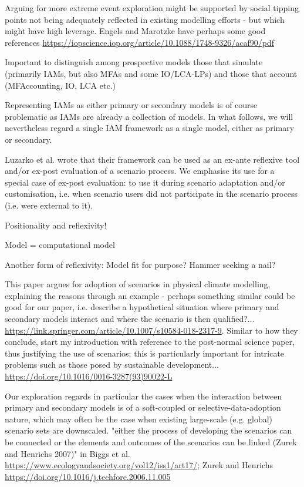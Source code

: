 \documentclass{article}
\begin{document}
Arguing for more extreme event exploration might be supported by social tipping points not being adequately reflected in existing modelling efforts - but which might have high leverage. Engels and Marotzke have perhaps some good references \url{https://iopscience.iop.org/article/10.1088/1748-9326/acaf90/pdf}

Important to distinguish among prospective models those that simulate (primarily IAMs, but also MFAs and some IO/LCA-LPs) and those that account (MFAccounting, IO, LCA etc.)

Representing IAMs as either primary or secondary models is of course problematic as IAMs are already a collection of models. In what follows, we will nevertheless regard a single IAM framework as a single model, either as primary or secondary.

Luzarko et al. wrote that their framework can be used as an ex-ante reflexive tool and/or ex-post evaluation of a scenario process. We emphasise its use for a special case of ex-post evaluation: to use it during scenario adaptation and/or customisation, i.e. when scenario users did not participate in the scenario process (i.e. were external to it).

Positionality and reflexivity!

Model = computational model

Another form of reflexivity: Model fit for purpose? Hammer seeking a nail?

This paper argues for adoption of scenarios in physical climate modelling, explaining the reasons through an example - perhaps something similar could be good for our paper, i.e. describe a hypothetical situation where primary and secondary models interact and where the scenario is then qualified?... \url{https://link.springer.com/article/10.1007/s10584-018-2317-9}. Similar to how they conclude, start my introduction with reference to the post-normal science paper, thus justifying the use of scenarios; this is particularly important for intricate problems such as those posed by sustainable development... \url{https://doi.org/10.1016/0016-3287(93)90022-L}


Our exploration regards in particular the cases when the interaction between primary and secondary models is of a soft-coupled or selective-data-adoption nature, which may often be the case when existing large-scale (e.g. global) scenario sets are downscaled.
"either the process of developing the scenarios can be connected or the elements and outcomes of the scenarios can be linked (Zurek and Henrichs 2007)" in Biggs et al. \url{https://www.ecologyandsociety.org/vol12/iss1/art17/}; Zurek and Henrichs \url{https://doi.org/10.1016/j.techfore.2006.11.005}
\end{document}
